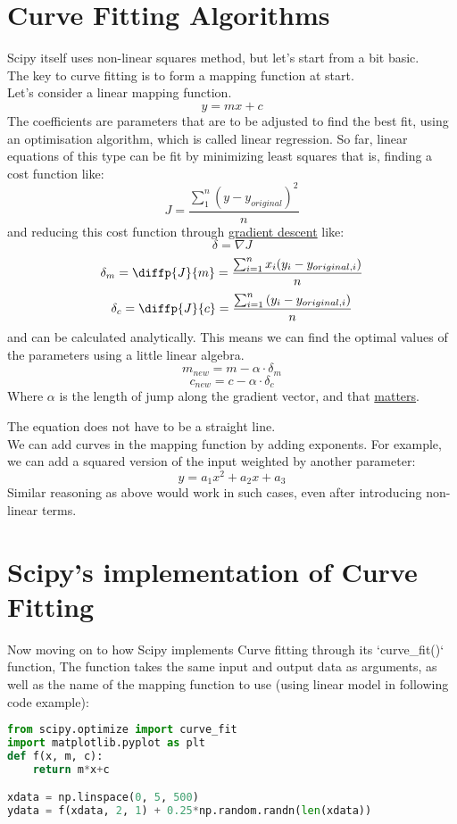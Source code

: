 \documentclass{article}
\begin{document}
\section*{Curve Fitting Algorithms}
Scipy itself uses non-linear squares method, but let's start from a bit basic.\\
The key to curve fitting is to form a mapping function at start.\\
Let's consider a linear mapping function. $$y = mx + c$$
The coefficients are parameters that are to be adjusted to find the best fit, using an optimisation algorithm, which is called linear regression.
So far, linear equations of this type can be fit by minimizing least squares
that is, finding a cost function like:
$$J = \frac{\sum_{1}^{n} {(y - y_{original})^2}}{n}$$
and reducing this cost function through \href{https://machinelearningmastery.com/gradient-descent-for-machine-learning/}{gradient descent} like:
\[
\delta = \nabla J
\]
$$
\delta_m = \diffp{J}{m} = \frac{\sum_{i=1}^n {x_i(y_i-y_{original, i})}}{n}
$$
$$
\delta_c = \diffp{J}{c} = \frac{\sum_{i=1}^n{(y_i-y_{original,i})}}{n}
$$
and can be calculated analytically. This means we can find the optimal values of the parameters using a little linear algebra.
$$
m_{new} = m - \alpha\cdot\delta_m
$$
$$
c_{new} = c - \alpha\cdot\delta_c
$$
Where $\alpha$ is the length of jump along the gradient vector, and that \href{https://www.mygreatlearning.com/blog/understanding-learning-rate-in-machine-learning/}{matters}.\par
The equation does not have to be a straight line.\\
We can add curves in the mapping function by adding exponents. For example, we can add a squared version of the input weighted by another parameter:
$$y = a_1x^2 + a_2x + a_3$$
Similar reasoning as above would work in such cases, even after introducing non-linear terms. 

\section*{Scipy's implementation of Curve Fitting}
Now moving on to how Scipy implements Curve fitting through its `curve\_fit()` function, The function takes the same input and output data as arguments, as well as the name of the mapping function to use (using linear model in following code example):

\vspace{0.4cm}
\begin{lstlisting}[language=Python]
from scipy.optimize import curve_fit
import matplotlib.pyplot as plt
def f(x, m, c):
    return m*x+c

xdata = np.linspace(0, 5, 500)
ydata = f(xdata, 2, 1) + 0.25*np.random.randn(len(xdata))

\end{lstlisting}
\end{document}
